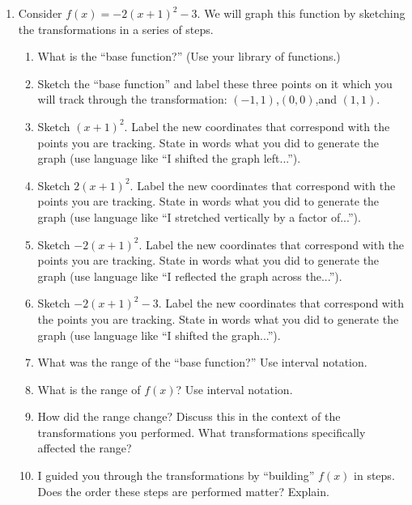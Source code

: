 \documentclass[12pt]{amsart}
\begin{document}
\begin{enumerate}
\item Consider $f(x)= -2(x+1)^2-3.$  We will graph this function by sketching the transformations in a series of steps.
\begin{enumerate}
\item What is the ``base function?'' (Use your library of functions.)
\item Sketch the ``base function'' and label these three points on it which you will track through the transformation: $(-1,1)$,$(0,0)$,and $(1,1)$.
\item Sketch $(x+1)^2$.  Label the new coordinates that correspond with the points you are tracking.  State in words what you did to generate the graph (use language like ``I shifted the graph left...'').
\item Sketch $2(x+1)^2$. Label the new coordinates that correspond with the points you are tracking.  State in words what you did to generate the graph (use language like ``I stretched vertically by a factor of...'').
\item Sketch $-2(x+1)^2$. Label the new coordinates that correspond with the points you are tracking.  State in words what you did to generate the graph (use language like ``I reflected the graph across the...'').
\item Sketch $-2(x+1)^2-3$. Label the new coordinates that correspond with the points you are tracking.  State in words what you did to generate the graph (use language like ``I shifted the graph...'').
\item What was the range of the ``base function?''  Use interval notation.
\item What is the range of $f(x)$? Use interval notation.
\item How did the range change?  Discuss this in the context of the transformations you performed.  What transformations specifically affected the range? 
\item I guided you through the transformations by ``building'' $f(x)$ in steps.  Does the order these steps are performed matter?  Explain.
\end{enumerate}



\end{enumerate}
\end{document}
